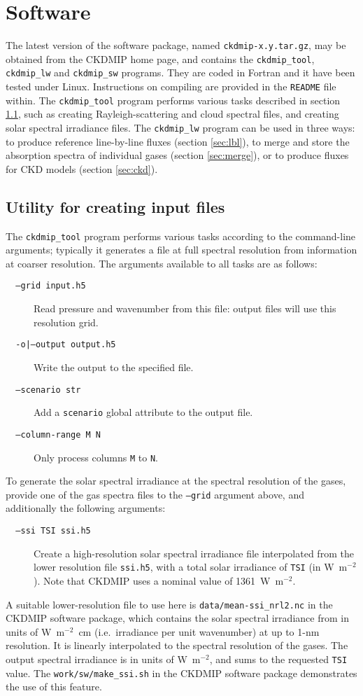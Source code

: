 \documentclass[twoside]{article}
\def\codesize{\small}
\def\code#1{{\codesize\texttt{#1}}}
\def\citem#1{\item[{\codesize\texttt{#1}}]}
\begin{document}
\section{Software}
\label{sec:software}
The latest version of the software package, named
\code{ckdmip-x.y.tar.gz}, may be obtained from the CKDMIP home page,
and contains the \code{ckdmip\_tool}, \code{ckdmip\_lw} and
\code{ckdmip\_sw} programs.  They are coded in Fortran and it have
been tested under Linux. Instructions on compiling are provided in the
\code{README} file within.  The \code{ckdmip\_tool} program performs
various tasks described in section \ref{sec:tool}, such as creating
Rayleigh-scattering and cloud spectral files, and creating solar
spectral irradiance files. The \code{ckdmip\_lw} program can be used
in three ways: to produce reference line-by-line fluxes (section
\ref{sec:lbl}), to merge and store the absorption spectra of
individual gases (section \ref{sec:merge}), or to produce fluxes for
CKD models (section \ref{sec:ckd}).

\subsection{Utility for creating input files}
\label{sec:tool}
The \code{ckdmip\_tool} program performs various tasks according to
the command-line arguments; typically it generates a file at full
spectral resolution from information at coarser resolution. The
arguments available to all tasks are as follows:
%
\begin{description}
\citem{~~--grid input.h5} Read pressure and wavenumber from this file:
output files will use this resolution grid.
\citem{~~-o|--output output.h5} Write the output to the specified file.
\citem{~~--scenario str} Add a \code{scenario} global attribute to the
output file.
\citem{~~--column-range M N} Only process columns \code{M} to \code{N}.
\end{description}
%

To generate the solar spectral irradiance at the spectral resolution
of the gases, provide one of the gas spectra files to the
\code{--grid} argument above, and additionally the following
arguments:
\begin{description}
\citem{~~--ssi TSI ssi.h5} Create a high-resolution solar spectral
irradiance file interpolated from the lower resolution file
\code{ssi.h5}, with a total solar irradiance of \code{TSI} (in
W~m$^{-2}$). Note that CKDMIP uses a nominal value of 1361~W~m$^{-2}$.
\end{description}
A suitable lower-resolution file to use here is
\code{data/mean-ssi\_nrl2.nc} in the CKDMIP software package, which
contains the solar spectral irradiance from \cite{Coddington+2016} in
units of W~m$^{-2}$~cm (i.e.\ irradiance per unit wavenumber) at up to
1-nm resolution.  It is linearly interpolated to the spectral
resolution of the gases. The output spectral irradiance is in units of
W~m$^{-2}$, and sums to the requested \code{TSI} value. The
\code{work/sw/make\_ssi.sh} in the CKDMIP software package
demonstrates the use of this feature.
\end{document}

